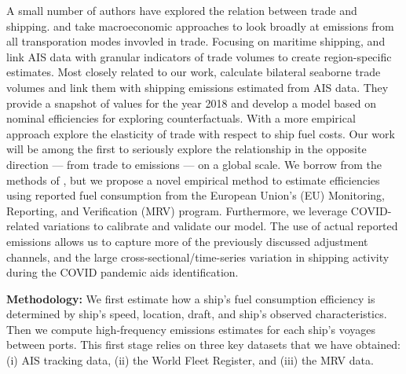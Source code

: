 \documentclass[hidelinks, 12pt,letterpaper]{article}
\begin{document}
A small number of authors have explored the relation between trade and shipping. \citet{cristea2013trade} and \citet{shapiro2016trade} take macroeconomic approaches to look broadly at emissions from all transporation modes invovled in trade. Focusing on maritime shipping, \citet{van2018spatially} and \citet{liu2019emissions} link AIS data with granular indicators of trade volumes to create region-specific estimates. Most closely related to our work, \citet{wang2021trade} calculate bilateral seaborne trade volumes and link them with shipping emissions estimated from AIS data. They provide a snapshot of values for the year 2018 and develop a model based on nominal efficiencies for exploring counterfactuals. With a more empirical approach \citet{brancaccio2018impact} explore the elasticity of trade with respect to ship fuel costs. Our work will be among the first to seriously explore the relationship in the opposite direction --- from trade to emissions --- on a global scale. We borrow from the methods of \citet{wang2021trade}, but we propose a novel empirical method to estimate efficiencies using reported fuel consumption from the European Union's (EU) Monitoring, Reporting, and Verification (MRV) program. Furthermore, we leverage COVID-related variations to calibrate and validate our model. The use of actual reported emissions allows us to capture more of the previously discussed adjustment channels, and the large cross-sectional/time-series variation in shipping activity during the COVID pandemic aids identification. %

 \smallskip

\noindent \textbf{Methodology:}  We first estimate how a ship's fuel consumption efficiency is determined by ship's speed, location, draft, and ship's observed characteristics. Then we compute high-frequency emissions estimates for each ship's voyages between ports. This first stage relies on three key datasets that we have obtained: (i) AIS tracking data, (ii) the World Fleet Register, and (iii) the MRV data.
\end{document}
